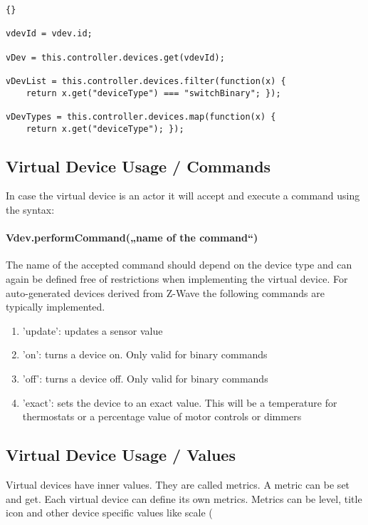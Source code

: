 \begin{lstlisting}[caption=Access vDevs]{}

vdevId = vdev.id;

vDev = this.controller.devices.get(vdevId);

vDevList = this.controller.devices.filter(function(x) { 
	return x.get("deviceType") === "switchBinary"; }); 

vDevTypes = this.controller.devices.map(function(x) { 
	return x.get("deviceType"); }); 
\end{lstlisting}

\subsection{Virtual Device Usage / Commands}

In case the virtual device is an actor it will accept and execute a command using the 
syntax:

\paragraph{Vdev.performCommand(„name of the command“)}

The name of the accepted command should depend on the device type and can again be defined 
free of restrictions when implementing the virtual device. For auto-generated devices 
derived from Z-Wave the following commands are typically implemented.

\begin{enumerate}
\item 'update': updates a sensor value
\item 'on': turns a device on.  Only valid for binary commands
\item 'off': turns a device off. Only valid for binary commands
\item 'exact': sets the device to an exact value. This will be a temperature for 
thermostats or a percentage value of motor controls or dimmers
\end{enumerate}

\subsection{Virtual Device Usage / Values}

Virtual devices have inner values. They are called metrics. A metric can be set and get. 
Each virtual device can define its own metrics. Metrics can be level, title icon and 
other device specific values like scale (%

